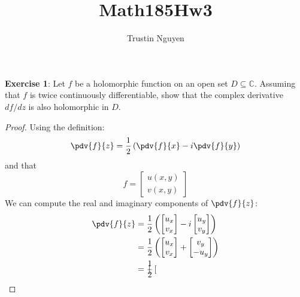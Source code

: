 \documentclass{article}
\title{Math185Hw3}
\author{Trustin Nguyen}
\begin{document}
    \maketitle

\reversemarginpar

\textbf{Exercise 1}: Let $f$ be a holomorphic function on an open set $D \subseteq \mathbb{C}$. Assuming that $f$ is twice continuously differentiable, show that the complex derivative $df/dz$ is also holomorphic in $D$.
    \begin{proof}
        Using the definition:
            \begin{equation*}
                \pdv{f}{z} = \dfrac{1}{2} \left(\pdv{f}{x} - i \pdv{f}{y}\right)
            \end{equation*}
        and that 
            \begin{equation*}
                f = \begin{bmatrix}
                    u(x, y) \\
                    v(x, y)   
                \end{bmatrix}
            \end{equation*}
        We can compute the real and imaginary components of $\pdv{f}{z}$:
            \begin{align*}
                \pdv{f}{z} &= \dfrac{1}{2}\left(\begin{bmatrix}
                    u_{x} \\
                    v_{x}   
                \end{bmatrix} - i \begin{bmatrix}
                    u_{y} \\
                    v_{y}   
                \end{bmatrix}\right) \\
                           &= \dfrac{1}{2}\left(\begin{bmatrix}
                               u_{x} \\
                               v_{x}   
                           \end{bmatrix} + \begin{bmatrix}
                               v_{y}  \\
                               -u_{y}   
                           \end{bmatrix}\right) \\
                           &= \dfrac{1}{2}\begin{bmatrix}

\end{bmatrix}
\end{align*}
\end{proof}
\end{document}
